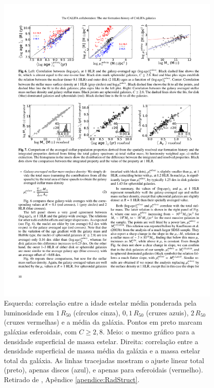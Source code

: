 \begin{figure}
	\includegraphics[width=1.0\columnwidth]{figuras/radstruct-01}
	\caption[Correlação entre idade, desidade superficial e massa estelar total]
	{Esquerda: correlação entre a idade estelar média ponderada pela luminosidade
	em $1\,R_{50}$ (círculos cinza), $0,1\,R_{50}$ (cruzes azuis), $2\,R_{50}$
	(cruzes vermelhas) e a média da galáxia. Pontos em preto marcam galáxias
	esferoidais, com $C \geq 2,8$. Meio: o mesmo gráfico para a densidade
	superficial de massa estelar. Direita: correlação entre a densidade
	superficial de massa média da galáxia e a massa estelar total da galáxia. As
	linhas tracejadas mostram o ajuste linear total (preto), apenas discos (azul),
	e apenas para esferoidais (vermelho).  Retirado de \citet[figura
	6]{GonzalezDelgado2014a}, Apêndice \ref{apendice:RadStruct}.}
	\label{fig:radStruct1}
\end{figure}

